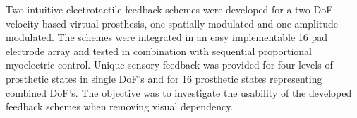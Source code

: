 Two intuitive electrotactile feedback schemes were developed for a two DoF velocity-based virtual prosthesis, one spatially modulated and one amplitude modulated. The schemes were integrated in an easy implementable 16 pad electrode array and tested in combination with sequential proportional myoelectric control. Unique sensory feedback was provided for four levels of prosthetic states in single DoF's and for 16 prosthetic states representing combined DoF's. The objective was to investigate the usability of the developed feedback schemes when removing visual dependency.


